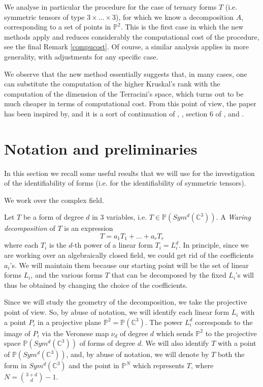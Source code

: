 \documentclass[a4paper,10pt,oneside]{article}
\theoremstyle{casep}
\newcommand{\C}{\mathbb{C}}
\newcommand{\Pj}{\mathbb{P}}
\theoremstyle{definition}
\begin{document}
We analyse in particular the procedure for the case of ternary forms $T$ (i.e. symmetric tensors of type $3\times \dots \times 3$), for which
we know a decomposition $A$, corresponding to a set of points in $\Pj^2$. This is the first case
in which the new methods apply and reduces considerably the computational cost of the procedure, see the final Remark \ref{compucost}.
Of course, a similar analysis applies in more generality, with adjustments for any specific case.

We observe that the new method essentially suggests that, in many cases, one can substitute the computation of the higher
Kruskal's rank with the computation of the dimension of the Terracini's space, which turns out to be much cheaper in terms of computational cost.
From this point of view, the paper has been inspired by, and it is a sort of continuation of 
\cite{due}, \cite{ventuno}, section 6 of \cite{sette}, and \cite{otto}.


\section{Notation and preliminaries}
\label{Notation and preliminaries}
In this section we recall some useful results that we will use for the investigation of the identifiability of forms (i.e. for the identifiability of symmetric tensors).
\smallskip

We work over the complex field.

Let $T$ be a form of degree $d$ in $3$ variables, i.e. $T\in \Pj(Sym^d(\C^{3}))$. A \emph{Waring decomposition} of $T$ is an expression
$$T= a_1T_1+\dots + a_rT_r$$
where each $T_i$ is the $d$-th power of a linear form $T_i=L_i^d$. In principle, since we are working over an algebraically closed field, 
we could get rid of the coefficients $a_i$'s. We will maintain them because our starting point will be the set of linear forms $L_i$, and the various 
forms $T$ that can be decomposed by the fixed $L_i$'s will thus be obtained by changing the choice of the coefficients.

Since we will study the geometry of the decomposition, we take the projective point of view. So, by abuse of notation, we will identify each linear form $L_i$ with a point
$P_i$ in a projective plane $\Pj^2=\Pj(\C^3)$. The power $L_i^d$ corresponds to the image of $P_i$ via the Veronese map $\nu_d$ of degree $d$ which sends
$\Pj^2$ to the projective space $\Pj(Sym^d(\C^{3}))$ of forms of degree $d$. We will also identify $T$ with a point of $\Pj(Sym^d(\C^{3}))$, and, by abuse of notation, we will denote
by $T$ both the form in $Sym^d(\C^{3})$ and the point in $\Pj^N$ which represents $T$, where $N = \binom{3+d}d - 1 $. 
\end{document}
